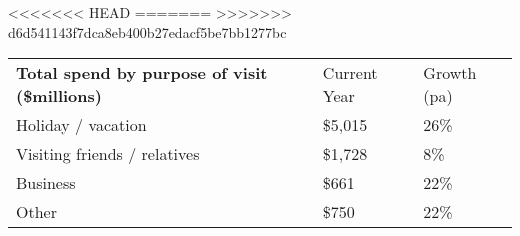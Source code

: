 <<<<<<< HEAD
=======
>>>>>>> d6d541143f7dca8eb400b27edacf5be7bb1277bc
\begin{tabular}[t]{p{4.85cm}>{\hfill}p{1.3cm}>{\hfill}p{1.35cm}}
 \textbf{Total spend by purpose of visit (\$millions)} & Current Year & Growth (pa) \\ 
 Holiday / vacation & \$5,015 & 26\% \\ 
  Visiting friends / relatives & \$1,728 & 8\% \\ 
  Business & \$661   & 22\% \\ 
  Other & \$750 & 22\% \\ 
  \end{tabular}
